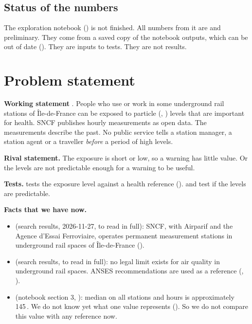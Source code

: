 \documentclass[11pt]{article}
\begin{document}
\subsection{Status of the numbers}
The exploration notebook () is not finished.
All numbers from it are \tObserved{} and preliminary. They come from a saved copy of the notebook outputs, which can be out of date ().
They are inputs to tests. They are not results.

\section{Problem statement}
\textbf{Working statement} \tAssumed.
People who use or work in some underground rail stations of Île-de-France can be exposed to particle (\pmten, \pmtwofive) levels that are important for health.
SNCF publishes hourly measurements as open data. The measurements describe the past.
No public service tells a station manager, a station agent or a traveller \emph{before} a period of high levels.

\textbf{Rival statement.}
The exposure is short or low, so a warning has little value. Or the levels are not predictable enough for a warning to be useful.

\textbf{Tests.}
 tests the exposure level against a health reference ().
 and  test if the levels are predictable.

\textbf{Facts that we have now.}
\begin{itemize}
  \item \tSource{} (search results, 2026-11-27, to read in full): SNCF, with Airparif and the Agence d'Essai Ferroviaire, operates permanent measurement stations in underground rail spaces of Île-de-France ().
  \item \tSource{} (search results, to read in full): no legal limit exists for air quality in underground rail spaces. ANSES recommendations are used as a reference (, ).
  \item \tObserved{} (notebook section 3, ): median \pmten{} on all stations and hours is approximately 145\,\ugm. We do not know yet what one value represents (). So we do not compare this value with any reference now.
\end{itemize}

\end{document}
